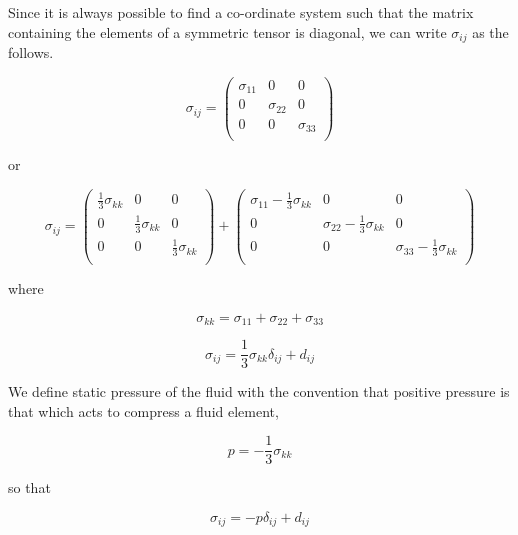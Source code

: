 Since it is always possible to find a co-ordinate system such that the matrix containing the elements of a symmetric tensor is diagonal, we can write $\sigma_{ij}$ as the follows.


\begin{equation}
\sigma_{ij} = \left(
\begin{array}{lll}
\sigma_{11} & 0 & 0 \\ 
0 & \sigma_{22} & 0 \\ 
0 & 0 & \sigma_{33} \\ 
\end{array}
\right)
\end{equation} 

or 

\begin{equation}
\sigma_{ij} = \left(
\begin{array}{lll}
\frac{1}{3}\sigma_{kk} & 0 & 0 \\ 
0 & \frac{1}{3}\sigma_{kk} & 0 \\ 
0 & 0 & \frac{1}{3}\sigma_{kk} \\ 
\end{array}
\right) + \left(
\begin{array}{lll}
\sigma_{11}-\frac{1}{3}\sigma_{kk} & 0 & 0 \\ 
0 & \sigma_{22}-\frac{1}{3}\sigma_{kk} & 0 \\ 
0 & 0 & \sigma_{33}-\frac{1}{3}\sigma_{kk} \\ 
\end{array}
\right) 
\end{equation} 

where

\begin{equation}
\sigma_{kk}=\sigma_{11} + \sigma_{22} + \sigma_{33}
\end{equation} 

\begin{equation}
\sigma_{ij} = \frac{1}{3}\sigma_{kk}\delta_{ij} +  d_{ij}
\end{equation} 

We define static pressure of the fluid with the convention that positive pressure is that which acts to compress a fluid element,

\begin{equation}
p = -\frac{1}{3}\sigma_{kk}
\end{equation} 

so that 

\begin{equation}
\label{sigmaij}
\sigma_{ij} = -p\delta_{ij} +  d_{ij}
\end{equation} 

